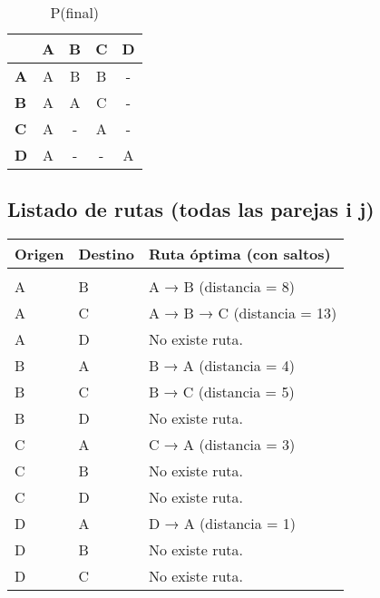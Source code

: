 \documentclass[11pt]{article}
\begin{document}
\begin{table}[H]\centering
\caption{P(final)}
\begin{tabular}{l c c c c}
\toprule
 & \textbf{A} & \textbf{B} & \textbf{C} & \textbf{D}\\\midrule
\textbf{A} & A & B & B & - \\
\textbf{B} & A & A & C & - \\
\textbf{C} & A & - & A & - \\
\textbf{D} & A & - & - & A \\
\bottomrule
\end{tabular}
\end{table}

\subsection*{Listado de rutas (todas las parejas i \neq j)}
\begin{longtable}{llp{}}
\toprule
\textbf{Origen} & \textbf{Destino} & \textbf{Ruta óptima (con saltos)}\\\midrule\\[-1ex]
A & B & A → B (distancia = 8)\\
A & C & A → B → C (distancia = 13)\\
A & D & No existe ruta.\\
B & A & B → A (distancia = 4)\\
B & C & B → C (distancia = 5)\\
B & D & No existe ruta.\\
C & A & C → A (distancia = 3)\\
C & B & No existe ruta.\\
C & D & No existe ruta.\\
D & A & D → A (distancia = 1)\\
D & B & No existe ruta.\\
D & C & No existe ruta.\\
\bottomrule
\end{longtable}
\end{document}
